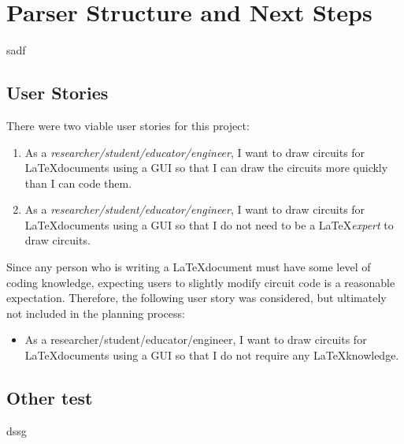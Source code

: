 %
\chapter{Parser Structure and Next Steps}\label{ch:parser-structure}
sadf

\section{User Stories}\label{sec:user-stories}
There were two viable user stories for this project:
\begin{enumerate}
    \item As a \emph{researcher/student/educator/engineer}, I want to draw circuits for \LaTeX documents using a GUI so that I can draw the circuits more quickly than I can code them.
    \item As a \emph{researcher/student/educator/engineer}, I want to draw circuits for \LaTeX documents using a GUI so that I do not need to be a \LaTeX \emph{expert} to draw circuits.
\end{enumerate}

Since any person who is writing a \LaTeX document must have some level of coding knowledge, expecting users to slightly modify circuit code is a reasonable expectation.
Therefore, the following user story was considered, but ultimately not included in the planning process:
\begin{itemize}
    \item {\color{red}As a researcher/student/educator/engineer, I want to draw circuits for \LaTeX documents using a GUI so that I do not require any \LaTeX knowledge.}
\end{itemize}

\section{Other test}
dssg